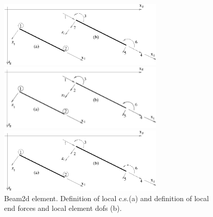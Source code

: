 \documentclass[a4paper]{article}
\begin{document}
\begin{figure}[tb]
\begin{htmlonly}
  \centerline{\includegraphics[width=0.7\textwidth]{beam2d.eps}}
\end{htmlonly}
\ifpdf
\centerline{\includegraphics[width=0.7\textwidth]{beam2d.pdf}}
\else
\centerline{\includegraphics[width=0.7\textwidth]{beam2d.eps}}
\fi
\caption{Beam2d element. Definition of local c.s.(a)  and definition of
local end forces and local element dofs (b).}
\label{beam2dfig}
\end{figure}
\end{document}
